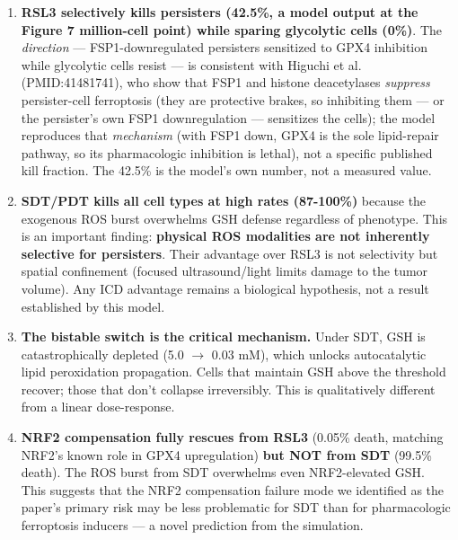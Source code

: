 \documentclass[11pt,twoside,openright]{report}
\begin{document}
\begin{enumerate}
\item \textbf{RSL3 selectively kills persisters (42.5\%, a model output at the Figure 7 million-cell point) while sparing glycolytic cells (0\%)}. The \textit{direction} --- FSP1-downregulated persisters sensitized to GPX4 inhibition while glycolytic cells resist --- is consistent with Higuchi et al. (PMID:41481741), who show that FSP1 and histone deacetylases \textit{suppress} persister-cell ferroptosis (they are protective brakes, so inhibiting them --- or the persister's own FSP1 downregulation --- sensitizes the cells); the model reproduces that \textit{mechanism} (with FSP1 down, GPX4 is the sole lipid-repair pathway, so its pharmacologic inhibition is lethal), not a specific published kill fraction. The 42.5\% is the model's own number, not a measured value.
\item \textbf{SDT/PDT kills all cell types at high rates (87-100\%)} because the exogenous ROS burst overwhelms GSH defense regardless of phenotype. This is an important finding: \textbf{physical ROS modalities are not inherently selective for persisters}. Their advantage over RSL3 is not selectivity but spatial confinement (focused ultrasound/light limits damage to the tumor volume). Any ICD advantage remains a biological hypothesis, not a result established by this model.
\item \textbf{The bistable switch is the critical mechanism.} Under SDT, GSH is catastrophically depleted (5.0 $\rightarrow$ 0.03 mM), which unlocks autocatalytic lipid peroxidation propagation. Cells that maintain GSH above the threshold recover; those that don't collapse irreversibly. This is qualitatively different from a linear dose-response.
\item \textbf{NRF2 compensation fully rescues from RSL3} (0.05\% death, matching NRF2's known role in GPX4 upregulation) \textbf{but NOT from SDT} (99.5\% death). The ROS burst from SDT overwhelms even NRF2-elevated GSH. This suggests that the NRF2 compensation failure mode we identified as the paper's primary risk may be less problematic for SDT than for pharmacologic ferroptosis inducers --- a novel prediction from the simulation.

\end{enumerate}
\end{document}
